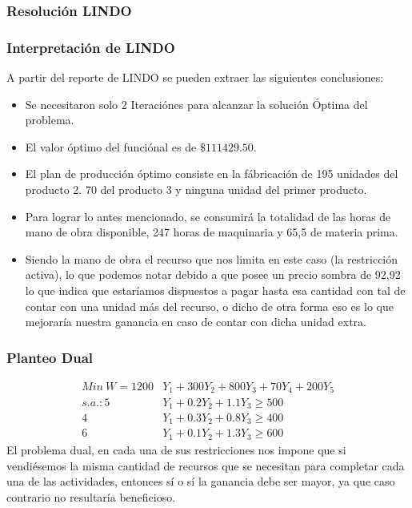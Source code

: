 \begin{homeworkProblem}[-1][Empresita]
\subsubsection{Resolución LINDO}
\subsubsection{Interpretación de LINDO}
A partir del reporte de LINDO se pueden extraer las siguientes conclusiones: 
\begin{itemize}
    \item Se necesitaron solo 2 Iteraciónes para alcanzar la solución Óptima del problema.
    \item El valor óptimo del funciónal es de $\$111429.50$.
    \item El plan de producción óptimo consiste en la fábricación de 195 unidades del producto 2. 70 del producto 3 y ninguna unidad del primer producto.
    \item Para lograr lo antes mencionado, se consumirá la totalidad de las horas de mano de obra disponible, 247 horas de maquinaria y 65,5 de materia prima.
    \item Siendo la mano de obra el recurso que nos limita en este caso (la restricción activa), lo que podemos notar debido a que posee un precio sombra de 92,92 lo que indica que estaríamos dispuestos a pagar hasta esa cantidad con tal de contar con una unidad más del recurso, o dicho de otra forma eso es lo que mejoraría nuestra ganancia en caso de contar con dicha unidad extra.
\end{itemize}

\subsubsection{Planteo Dual}
\begin{align*}
    Min\ W = 1200&Y_1 + 300Y_2 + 800Y_3 + 70Y_4 + 200Y_5 \\
    s.a.:5&Y_1 + 0.2Y_2 + 1.1Y_3 \ge 500 \\
    4&Y_1 + 0.3Y_2 + 0.8Y_3 \ge 400 \\
    6&Y_1 + 0.1Y_2 + 1.3Y_3 \ge 600
\end{align*}
El problema dual, en cada una de sus restricciones nos impone que si vendiésemos la misma cantidad de recursos que se necesitan para completar cada una de las actividades, entonces sí o sí la ganancia debe ser mayor, ya que caso contrario no resultaría beneficioso.
\end{homeworkProblem} 